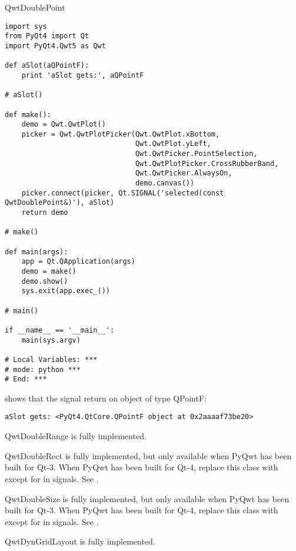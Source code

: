\documentclass{manual}
\begin{document}
{\begin{classdesc*}{QwtDoublePoint}
\begin{verbatim}
import sys
from PyQt4 import Qt
import PyQt4.Qwt5 as Qwt

def aSlot(aQPointF):
    print 'aSlot gets:', aQPointF

# aSlot()

def make():
    demo = Qwt.QwtPlot()
    picker = Qwt.QwtPlotPicker(Qwt.QwtPlot.xBottom,
                               Qwt.QwtPlot.yLeft,
                               Qwt.QwtPicker.PointSelection,
                               Qwt.QwtPlotPicker.CrossRubberBand,
                               Qwt.QwtPicker.AlwaysOn,
                               demo.canvas())
    picker.connect(picker, Qt.SIGNAL('selected(const QwtDoublePoint&)'), aSlot)
    return demo

# make()

def main(args):
    app = Qt.QApplication(args)
    demo = make()
    demo.show()
    sys.exit(app.exec_())

# main()

if __name__ == '__main__':
    main(sys.argv)

# Local Variables: ***
# mode: python ***
# End: ***
  \end{verbatim}
  shows that the signal return on object of type QPointF:
  \begin{verbatim}
aSlot gets: <PyQt4.QtCore.QPointF object at 0x2aaaaf73be20>
  \end{verbatim}
\end{classdesc*}

\begin{classdesc*}{QwtDoubleRange}
  is fully implemented.
\end{classdesc*}

\begin{classdesc*}{QwtDoubleRect}
  is fully implemented, but only available when PyQwt has been built for Qt-3.
  When PyQwt has been built for Qt-4, replace this class with 
  except for in signals. See .
\end{classdesc*}

\begin{classdesc*}{QwtDoubleSize}
  is fully implemented, but only available when PyQwt has been built for Qt-3.
  When PyQwt has been built for Qt-4, replace this class with 
  except for in signals. See .
\end{classdesc*}

\begin{classdesc*}{QwtDynGridLayout}
  is fully implemented.
\end{classdesc*}

}
\end{document}
